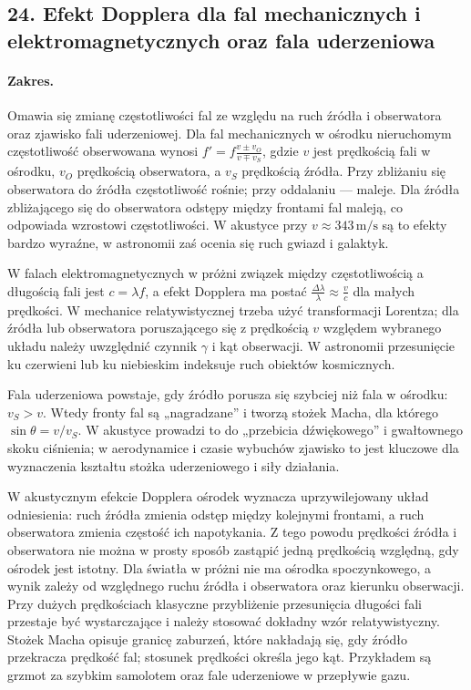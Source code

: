 \documentclass[11pt,a4paper]{article}
\begin{document}
\subsection{24. Efekt Dopplera dla fal mechanicznych i elektromagnetycznych oraz fala uderzeniowa}
\paragraph{Zakres.} Omawia się zmianę częstotliwości fal ze względu na ruch źródła i obserwatora oraz zjawisko fali uderzeniowej. Dla fal mechanicznych w ośrodku nieruchomym częstotliwość obserwowana wynosi $f' = f\frac{v\pm v_O}{v\mp v_S}$, gdzie $v$ jest prędkością fali w ośrodku, $v_O$ prędkością obserwatora, a $v_S$ prędkością źródła. Przy zbliżaniu się obserwatora do źródła częstotliwość rośnie; przy oddalaniu — maleje. Dla źródła zbliżającego się do obserwatora odstępy między frontami fal maleją, co odpowiada wzrostowi częstotliwości. W akustyce przy $v\approx 343\,\mathrm{m/s}$ są to efekty bardzo wyraźne, w astronomii zaś ocenia się ruch gwiazd i galaktyk.\par
W falach elektromagnetycznych w próżni związek między częstotliwością a długością fali jest $c=\lambda f$, a efekt Dopplera ma postać $\frac{\Delta\lambda}{\lambda}\approx \frac{v}{c}$ dla małych prędkości. W mechanice relatywistycznej trzeba użyć transformacji Lorentza; dla źródła lub obserwatora poruszającego się z prędkością $v$ względem wybranego układu należy uwzględnić czynnik $\gamma$ i kąt obserwacji. W astronomii przesunięcie ku czerwieni lub ku niebieskim indeksuje ruch obiektów kosmicznych.\par
Fala uderzeniowa powstaje, gdy źródło porusza się szybciej niż fala w ośrodku: $v_S>v$. Wtedy fronty fal są „nagradzane” i tworzą stożek Macha, dla którego $\sin\theta=v/v_S$. W akustyce prowadzi to do „przebicia dźwiękowego” i gwałtownego skoku ciśnienia; w aerodynamice i czasie wybuchów zjawisko to jest kluczowe dla wyznaczenia kształtu stożka uderzeniowego i siły działania.\par

W akustycznym efekcie Dopplera ośrodek wyznacza uprzywilejowany układ odniesienia: ruch źródła zmienia odstęp między kolejnymi frontami, a ruch obserwatora zmienia częstość ich napotykania. Z tego powodu prędkości źródła i obserwatora nie można w prosty sposób zastąpić jedną prędkością względną, gdy ośrodek jest istotny. Dla światła w próżni nie ma ośrodka spoczynkowego, a wynik zależy od względnego ruchu źródła i obserwatora oraz kierunku obserwacji. Przy dużych prędkościach klasyczne przybliżenie przesunięcia długości fali przestaje być wystarczające i należy stosować dokładny wzór relatywistyczny. Stożek Macha opisuje granicę zaburzeń, które nakładają się, gdy źródło przekracza prędkość fal; stosunek prędkości określa jego kąt. Przykładem są grzmot za szybkim samolotem oraz fale uderzeniowe w przepływie gazu.
\par
\end{document}

